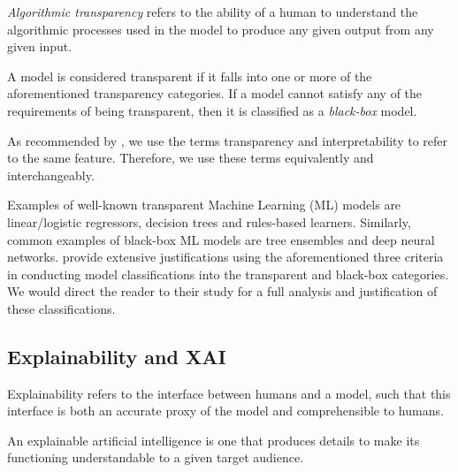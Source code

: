 \begin{remark}
  \textit{Algorithmic transparency} refers to the ability of a human to understand the algorithmic processes used in the model to produce any given output from any given input.
\end{remark}

\begin{remark}
  A model is considered transparent if it falls into one or more of the aforementioned transparency categories. If a model cannot satisfy any of the requirements of being transparent, then it is classified as a \textit{black-box} model. 
\end{remark}

\begin{remark}
  \label{rmk:equivalence}
  As recommended by \citet[Section 2.1, Page 3]{arrieta2020explainable}, we use the terms transparency and interpretability to refer to the same feature. Therefore, we use these terms equivalently and interchangeably.
\end{remark}

Examples of well-known transparent Machine Learning (ML) models are linear/logistic regressors, decision trees and rules-based learners. Similarly, common examples of black-box ML models are tree ensembles and deep neural networks. \citet{arrieta2020explainable} provide extensive justifications using the aforementioned three criteria in conducting model classifications into the transparent and black-box categories. We would direct the reader to their study for a full analysis and justification of these classifications.

\subsection{Explainability and XAI}

\begin{definition}
  Explainability refers to the interface between humans and a model, such that this interface is both an accurate proxy of the model and comprehensible to humans. 
\end{definition}

\begin{definition}
  An explainable artificial intelligence is one that produces details to make its functioning understandable to a given target audience. 
\end{definition}

